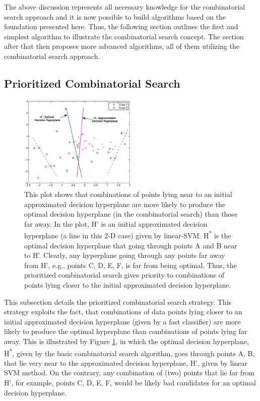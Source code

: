 The above discussion represents all necessary knowledge for the
combinatorial search approach and it is now possible to build
algorithms based on the foundation presented here. Thus, the following
section outlines the first and simplest algorithm to illustrate the
combinatorial search concept. The section after that then proposes
more advanced algorithms, all of them utilizing the combinatorial
search approach.


\subsection{Prioritized Combinatorial Search}
\label{sec:cs.prioritized}

\begin{figure}[here]
\includegraphics[width=0.50\textwidth]{images/fig42_nearfar.eps}
\caption{ This plot shows that combinations of points lying near to an
  initial approximated decision hyperplane are more likely to produce
  the optimal decision hyperplane (in the combinatorial search) than
  those far away. In the plot, H' is an initial approximated decision
  hyperplane (a line in this 2-D case) given by
  linear-SVM. H\textsuperscript{*} is the optimal decision hyperplane
  that going through points A and B near to H'. Clearly, any
  hyperplane going through any points far away from H', e.g., points
  C, D, E, F, is far from being optimal. Thus, the prioritized
  combinatorial search gives priority to combinations of points lying
  closer to the initial approximated decision hyperplane.  }
\label{fig:cs_nearfar}
\end{figure}

This subsection details the prioritized combinatorial search
strategy. This strategy exploits the fact, that combinations of data
points lying closer to an initial approximated decision hyperplane
(given by a fast classifier) are more likely to produce the optimal
hyperplane than combinations of points lying far away. This is
illustrated by Figure \ref{fig:cs_nearfar}, in which the optimal
decision hyperplane, H\textsuperscript{*}, given by the basic
combinatorial search algorithm, goes through points A, B, that lie
very near to the approximated decision hyperplane, H', given by linear
SVM method. On the contrary, any combination of (two) points that lie
far from H', for example, points C, D, E, F, would be likely bad
candidates for an optimal decision hyperplane.

